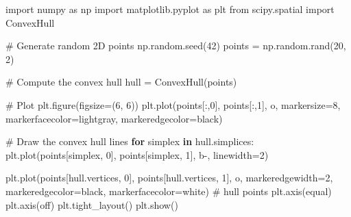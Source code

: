\documentclass[
  letterpaper,
  DIV=11,
  numbers=noendperiod]{scrartcl}
\newenvironment{Shaded}{\begin{snugshade}}{\end{snugshade}}
\newcommand{\CommentTok}[1]{\textcolor[rgb]{0.37,0.37,0.37}{#1}}
\newcommand{\ControlFlowTok}[1]{\textcolor[rgb]{0.00,0.23,0.31}{\textbf{#1}}}
\newcommand{\DecValTok}[1]{\textcolor[rgb]{0.68,0.00,0.00}{#1}}
\newcommand{\ImportTok}[1]{\textcolor[rgb]{0.00,0.46,0.62}{#1}}
\newcommand{\KeywordTok}[1]{\textcolor[rgb]{0.00,0.23,0.31}{\textbf{#1}}}
\newcommand{\NormalTok}[1]{\textcolor[rgb]{0.00,0.23,0.31}{#1}}
\newcommand{\OperatorTok}[1]{\textcolor[rgb]{0.37,0.37,0.37}{#1}}
\newcommand{\StringTok}[1]{\textcolor[rgb]{0.13,0.47,0.30}{#1}}
\begin{document}
\begin{Shaded}
\begin{Highlighting}[]
\ImportTok{import}\NormalTok{ numpy }\ImportTok{as}\NormalTok{ np}
\ImportTok{import}\NormalTok{ matplotlib.pyplot }\ImportTok{as}\NormalTok{ plt}
\ImportTok{from}\NormalTok{ scipy.spatial }\ImportTok{import}\NormalTok{ ConvexHull}

\CommentTok{\# Generate random 2D points}
\NormalTok{np.random.seed(}\DecValTok{42}\NormalTok{)}
\NormalTok{points }\OperatorTok{=}\NormalTok{ np.random.rand(}\DecValTok{20}\NormalTok{, }\DecValTok{2}\NormalTok{)}

\CommentTok{\# Compute the convex hull}
\NormalTok{hull }\OperatorTok{=}\NormalTok{ ConvexHull(points)}

\CommentTok{\# Plot}
\NormalTok{plt.figure(figsize}\OperatorTok{=}\NormalTok{(}\DecValTok{6}\NormalTok{, }\DecValTok{6}\NormalTok{))}
\NormalTok{plt.plot(points[:,}\DecValTok{0}\NormalTok{], points[:,}\DecValTok{1}\NormalTok{], }\StringTok{\textquotesingle{}o\textquotesingle{}}\NormalTok{, markersize}\OperatorTok{=}\DecValTok{8}\NormalTok{, markerfacecolor}\OperatorTok{=}\StringTok{\textquotesingle{}lightgray\textquotesingle{}}\NormalTok{, markeredgecolor}\OperatorTok{=}\StringTok{\textquotesingle{}black\textquotesingle{}}\NormalTok{)}

\CommentTok{\# Draw the convex hull lines}
\ControlFlowTok{for}\NormalTok{ simplex }\KeywordTok{in}\NormalTok{ hull.simplices:}
\NormalTok{    plt.plot(points[simplex, }\DecValTok{0}\NormalTok{], points[simplex, }\DecValTok{1}\NormalTok{], }\StringTok{\textquotesingle{}b{-}\textquotesingle{}}\NormalTok{, linewidth}\OperatorTok{=}\DecValTok{2}\NormalTok{)}

\NormalTok{plt.plot(points[hull.vertices, }\DecValTok{0}\NormalTok{], points[hull.vertices, }\DecValTok{1}\NormalTok{], }\StringTok{\textquotesingle{}o\textquotesingle{}}\NormalTok{, markeredgewidth}\OperatorTok{=}\DecValTok{2}\NormalTok{, markeredgecolor}\OperatorTok{=}\StringTok{\textquotesingle{}black\textquotesingle{}}\NormalTok{, markerfacecolor}\OperatorTok{=}\StringTok{\textquotesingle{}white\textquotesingle{}}\NormalTok{)  }\CommentTok{\# hull points}
\NormalTok{plt.axis(}\StringTok{\textquotesingle{}equal\textquotesingle{}}\NormalTok{)}
\NormalTok{plt.axis(}\StringTok{\textquotesingle{}off\textquotesingle{}}\NormalTok{)}
\NormalTok{plt.tight\_layout()}
\NormalTok{plt.show()}
\end{Highlighting}
\end{Shaded}
\end{document}
